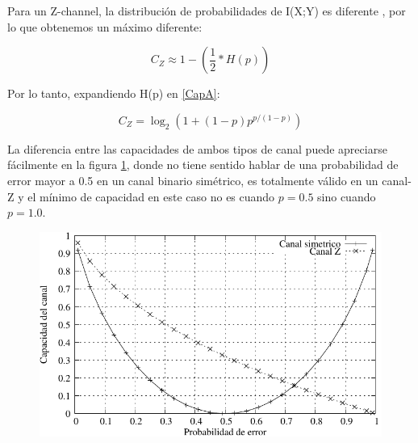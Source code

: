 Para un Z-channel, la distribución de probabilidades de I(X;Y) es diferente \cite{Tallini:02}, por lo que obtenemos un máximo diferente:

\begin{equation}\label{CapA}
C_{Z} \approx 1 - \left(\frac{1}{2}*H(p)\right)
\end{equation}

Por lo tanto, expandiendo H(p) en \ref{CapA}:

$$ C_{Z} = \log_2\left(1+(1-p) p^{p/(1-p)}\right) $$

La diferencia entre las capacidades de ambos tipos de canal puede apreciarse fácilmente en la figura \ref{fig:CompBZ}, donde no tiene sentido hablar de una probabilidad de error mayor a 0.5 en un canal binario simétrico, es totalmente válido en un canal-Z y el mínimo de capacidad en este caso no es cuando $p=0.5$ sino cuando $p=1.0$.

\begin{figure}[th]
  \begin{center}
    \includegraphics[scale=0.9]{graphs/grafico_comparacion_capacidad_binaria_z}
  \end{center}
  \label{fig:CompBZ}
\end{figure}


